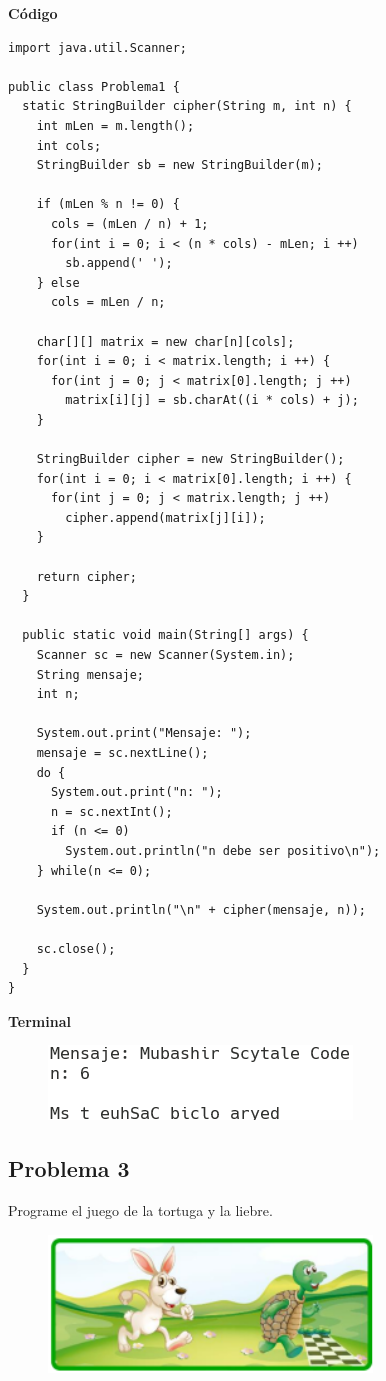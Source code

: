 \documentclass[11pt, twocolumn]{article}
\begin{document}
  \textbf{Código}
  \begin{lstlisting}
import java.util.Scanner;

public class Problema1 {
  static StringBuilder cipher(String m, int n) {
    int mLen = m.length();
    int cols;
    StringBuilder sb = new StringBuilder(m);

    if (mLen % n != 0) {
      cols = (mLen / n) + 1;
      for(int i = 0; i < (n * cols) - mLen; i ++)
        sb.append(' ');
    } else 
      cols = mLen / n;
    
    char[][] matrix = new char[n][cols];
    for(int i = 0; i < matrix.length; i ++) {
      for(int j = 0; j < matrix[0].length; j ++)
        matrix[i][j] = sb.charAt((i * cols) + j);
    }
    
    StringBuilder cipher = new StringBuilder();
    for(int i = 0; i < matrix[0].length; i ++) {
      for(int j = 0; j < matrix.length; j ++)
        cipher.append(matrix[j][i]);
    }

    return cipher;
  }

  public static void main(String[] args) {
    Scanner sc = new Scanner(System.in);
    String mensaje;
    int n;

    System.out.print("Mensaje: ");
    mensaje = sc.nextLine();
    do {
      System.out.print("n: ");
      n = sc.nextInt();
      if (n <= 0)
        System.out.println("n debe ser positivo\n");
    } while(n <= 0);

    System.out.println("\n" + cipher(mensaje, n));

    sc.close();
  }
}    
  \end{lstlisting}

  \textbf{Terminal}
  \begin{figure}[ht]
    \includegraphics[width=0.6\columnwidth, center]{P1.png}
  \end{figure}

  \subsection*{Problema 3}
  Programe el juego de la tortuga y la liebre.

  \begin{figure}[ht]
    \includegraphics[width=0.6\columnwidth, center]{TortugaLiebre.png}
  \end{figure}
  
\end{document}
